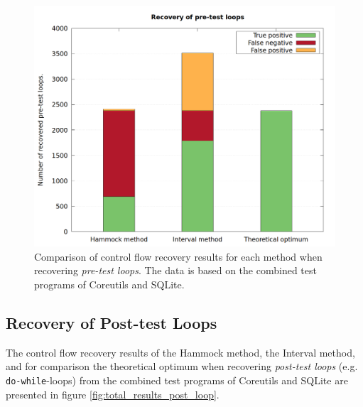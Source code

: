 \begin{figure}[htbp]
	\centering
	\includegraphics[width=\textwidth]{inc/5_results/results_pre_loop.png}
	\caption{Comparison of control flow recovery results for each method when recovering \textit{pre-test loops}. The data is based on the combined test programs of Coreutils and SQLite.}
	\label{fig:total_results_pre_loop}
\end{figure}

\clearpage

\subsection{Recovery of Post-test Loops}

The control flow recovery results of the Hammock method, the Interval method, and for comparison the theoretical optimum when recovering \textit{post-test loops} (e.g. \texttt{do-while}-loops) from the combined test programs of Coreutils and SQLite are presented in figure \ref{fig:total_results_post_loop}.

